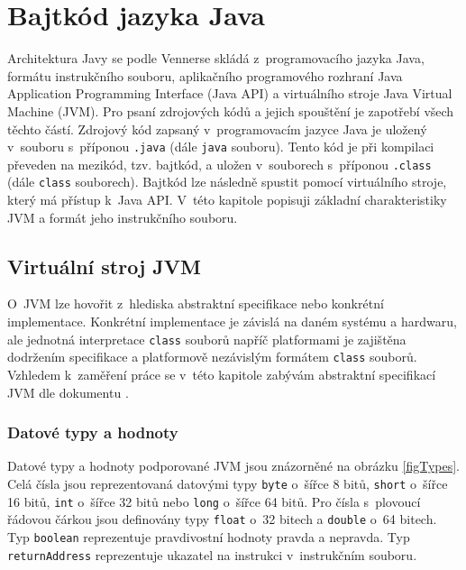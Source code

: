 \chapter{Bajtkód jazyka Java}\label{Bytecode}

Architektura Javy se podle Vennerse \cite{Venners:InsideJVM} skládá z~programovacího jazyka Java, formátu instrukčního souboru, aplikačního programového rozhraní Java Application Programming Interface (Java API) a virtuálního stroje Java Virtual Machine (JVM). Pro psaní zdrojových kódů a jejich spouštění je zapotřebí všech těchto částí.
Zdrojový kód zapsaný v~programovacím jazyce Java je uložený v~souboru s~příponou \texttt{.java} (dále \texttt{java} souboru). Tento kód je při kompilaci převeden na mezikód, tzv. bajtkód, a uložen v~souborech s~příponou \texttt{.class} (dále \texttt{class} souborech). Bajtkód lze následně spustit pomocí virtuálního stroje, který má přístup k~Java API. 
V~této kapitole popisuji základní charakteristiky JVM a formát jeho instrukčního souboru.

\section{Virtuální stroj JVM}\label{JVM}

O~JVM lze  hovořit z~hlediska abstraktní specifikace nebo konkrétní implementace. Konkrétní implementace je závislá na daném systému a hardwaru, ale jednotná interpretace \texttt{class} souborů napříč platformami je zajištěna dodržením specifikace a platformově nezávislým formátem \texttt{class} souborů. Vzhledem k~zaměření práce se v~této kapitole zabývám abstraktní specifikací JVM dle dokumentu \cite{Lindholm:JVM}. 

\subsection{Datové typy a hodnoty}\label{JVMTypes}

Datové typy a hodnoty podporované JVM jsou znázorněné na obrázku \ref{figTypes}. Celá čísla jsou reprezentovaná datovými typy \texttt{byte} o~šířce 8 bitů, \texttt{short} o~šířce 16 bitů, \texttt{int} o~šířce 32 bitů nebo \texttt{long} o~šířce 64 bitů. Pro čísla s~plovoucí řádovou čárkou jsou definovány typy \texttt{float} o~32 bitech a \texttt{double} o~64 bitech. Typ \texttt{boolean} reprezentuje pravdivostní hodnoty pravda a nepravda. Typ \texttt{returnAddress} reprezentuje ukazatel na instrukci v~instrukčním souboru.

